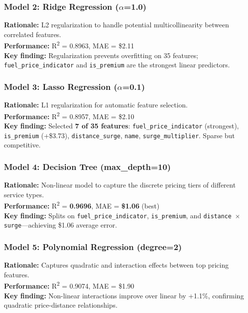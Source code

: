 \documentclass[12pt,a4paper]{article}
\begin{document}
\subsubsection*{Model 2: Ridge Regression ($\alpha$=1.0)}
\textbf{Rationale:} L2 regularization to handle potential multicollinearity between correlated features.\\
\textbf{Performance:} R\textsuperscript{2} = 0.8963, MAE = \$2.11\\
\textbf{Key finding:} Regularization prevents overfitting on 35 features; \texttt{fuel\_price\_indicator} and \texttt{is\_premium} are the strongest linear predictors.

\subsubsection*{Model 3: Lasso Regression ($\alpha$=0.1)}
\textbf{Rationale:} L1 regularization for automatic feature selection.\\
\textbf{Performance:} R\textsuperscript{2} = 0.8957, MAE = \$2.10\\
\textbf{Key finding:} Selected \textbf{7 of 35 features}: \texttt{fuel\_price\_indicator} (strongest), \texttt{is\_premium} (+\$3.73), \texttt{distance\_surge}, \texttt{name}, \texttt{surge\_multiplier}. Sparse but competitive.

\subsubsection*{Model 4: Decision Tree (max\_depth=10)}
\textbf{Rationale:} Non-linear model to capture the discrete pricing tiers of different service types.\\
\textbf{Performance:} R\textsuperscript{2} = \textbf{0.9696}, MAE = \textbf{\$1.06} (best)\\
\textbf{Key finding:} Splits on \texttt{fuel\_price\_indicator}, \texttt{is\_premium}, and \texttt{distance $\times$ surge}---achieving \$1.06 average error.

\subsubsection*{Model 5: Polynomial Regression (degree=2)}
\textbf{Rationale:} Captures quadratic and interaction effects between top pricing features.\\
\textbf{Performance:} R\textsuperscript{2} = 0.9074, MAE = \$1.90\\
\textbf{Key finding:} Non-linear interactions improve over linear by +1.1\%, confirming quadratic price-distance relationships.
\end{document}
